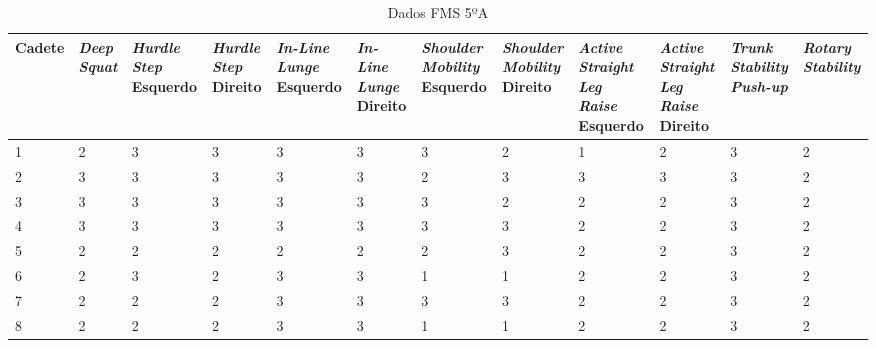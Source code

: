 \begin{landscape}
    
    \begin{table}[h]
        \centering
        \caption{Dados FMS 5ºA}
        \label{tab:fms5A}
        \renewcommand{\arraystretch}{1.3}  %
        \begin{adjustbox}{scale=0.9}
        \begin{tabular}{|p{1.8cm}|p{1.6cm}|p{1.6cm}|p{1.6cm}|p{1.6cm}|p{1.6cm}|p{1.6cm}|p{1.6cm}|p{1.6cm}|p{1.6cm}|p{1.6cm}|p{1.6cm}|}
            \hline
            \textbf{Cadete} & \textbf{\textit{Deep Squat}} & \textbf{\textit{Hurdle Step} Esquerdo} & \textbf{\textit{Hurdle Step} Direito} & \textbf{\textit{In-Line Lunge} Esquerdo} & \textbf{\textit{In-Line Lunge} Direito} & \textbf{\textit{Shoulder Mobility} Esquerdo} & \textbf{\textit{Shoulder Mobility} Direito} & \textbf{\textit{Active Straight Leg Raise} Esquerdo} & \textbf{\textit{Active Straight Leg Raise} Direito} & \textbf{\textit{Trunk Stability Push-up}} & \textbf{\textit{Rotary Stability}} \\
            \hline
            1 & 2 & 3 & 3 & 3 & 3 & 3 & 2 & 1 & 2 & 3 & 2 \\
            2 & 3 & 3 & 3 & 3 & 3 & 2 & 3 & 3 & 3 & 3 & 2 \\
            3 & 3 & 3 & 3 & 3 & 3 & 3 & 2 & 2 & 2 & 3 & 2 \\
            4 & 3 & 3 & 3 & 3 & 3 & 3 & 3 & 2 & 2 & 3 & 2 \\
            5 & 2 & 2 & 2 & 2 & 2 & 2 & 3 & 2 & 2 & 3 & 2 \\
            6 & 2 & 3 & 2 & 3 & 3 & 1 & 1 & 2 & 2 & 3 & 2 \\
            7 & 2 & 2 & 2 & 3 & 3 & 3 & 3 & 2 & 2 & 3 & 2 \\
            8 & 2 & 2 & 2 & 3 & 3 & 1 & 1 & 2 & 2 & 3 & 2 \\
            \hline
        \end{tabular}
        \end{adjustbox}
    \end{table}
    

\end{landscape}
